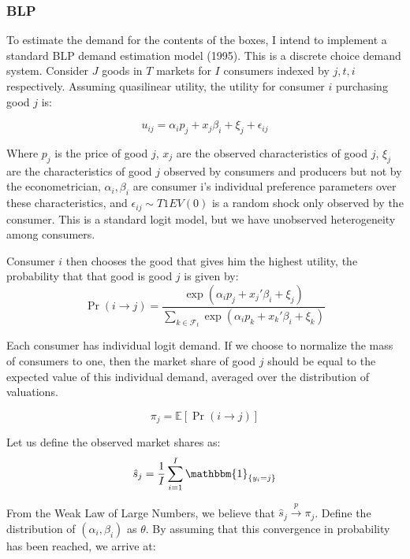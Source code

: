 \documentclass[12pt]{paper}
\newcommand{\plim}{ \overset{p}{\to} }
\newcommand{\exV}[1]{\mathbb{E} \left [ #1 \right ]}
\newcommand{\indicate}[1]{ \mathbbm{1}_{\{#1\}}}
\begin{document}
\subsubsection{BLP}

To estimate the demand for the contents of the boxes, I intend to
implement a standard BLP demand estimation model (1995). This is a discrete
choice demand system. Consider $J$ goods in $T$ markets for $I$
consumers indexed by $j,t,i$ respectively. Assuming quasilinear
utility, the utility for consumer $i$ purchasing good $j$ is:

\begin{equation*}
  u_{ij} = \alpha_i p_j + x_j \beta_i + \xi_j + \epsilon_{ij}
\end{equation*}

Where $p_j$ is the price of good $j$, $x_j$ are the observed
characteristics of good $j$, $\xi_j$ are the characteristics of good
$j$ observed by consumers and producers but not by the econometrician,
$\alpha_i, \beta_i$ are consumer i's individual preference parameters over
these characteristics, and $\epsilon_{ij} \sim T1EV(0)$ is a random shock only
observed by the consumer. This is a standard logit model, but we have
unobserved heterogeneity among consumers.

Consumer $i$ then chooses the good that gives him the highest utility,
the probability that that good is good $j$ is given by:
\begin{equation*}
  \Pr( i \rightarrow j ) = \frac{\exp( \alpha_i p_j + x_j' \beta_i + \xi_j)}{\sum_{k \in
      \mathcal{F}_t} \exp( \alpha_i p_k + x_k' \beta_i + \xi_k)}
\end{equation*}

Each consumer has individual logit demand. If we choose to normalize
the mass of consumers to one, then the market share of good $j$ should
be equal to the expected value of this individual demand, averaged
over the distribution of valuations.

\begin{equation*}
  \pi_j = \exV{ \Pr( i \rightarrow j )}
\end{equation*}

Let us define the observed market shares as:
\begin{equation*}
  \hat{s}_j = \frac{1}{I} \sum_{i = 1}^I \indicate{y_i = j}
\end{equation*}

From the Weak Law of Large Numbers, we believe that $\hat{s}_j \plim
\pi_j$. Define the distribution of $(\alpha_i, \beta_i)$ as $\theta$. By assuming that
this convergence in probability has been reached, we arrive at:
\end{document}
